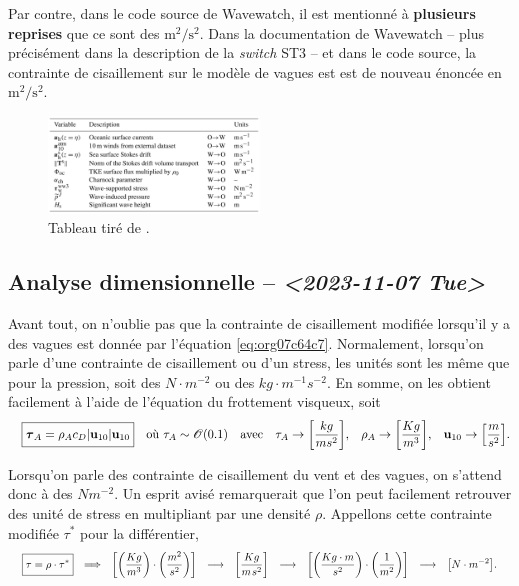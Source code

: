 \documentclass[10pt]{article}
\numberwithin{equation}{section}
\newcommand{\uu}{\vb{u}}
\newcommand{\tall}{\vphantom{pA^{x^x}_p}}
\newcommand{\pt}{\hspace{1pt}} %
\begin{document}
Par contre, dans le code source de Wavewatch, il est mentionné à \textbf{plusieurs reprises} que ce sont des \(\mathrm{m}^2/\mathrm{s}^2\).
Dans la documentation de Wavewatch -- plus précisément dans la description de la \emph{switch} ST3 -- et dans le code source, la contrainte de cisaillement sur le modèle de vagues est est de nouveau énoncée en \(\mathrm{m}^2/\mathrm{s}^2\).

\begin{figure}[ht]
\centering
\includegraphics[width=0.5\textwidth]{figures/articles/gmd-13-3067-2020-t01-web.png}
\caption{\label{fig:org12134f0}Tableau tiré de \textcite{couvelard2020development}.}
\end{figure}
\subsection{Analyse dimensionnelle -- \textit{<2023-11-07 Tue>}}
\label{sec:org3419b5b}
\label{org914db11}

Avant tout, on n'oublie pas que la contrainte de cisaillement modifiée lorsqu'il y a des vagues est donnée par l'équation \ref{eq:org07c64c7}. 
Normalement, lorsqu'on parle d'une contrainte de cisaillement ou d'un stress, les unités sont les même que pour la pression, soit des \(N\cdot m^{-2}\) ou des \(kg\cdot m^{-1}s^{-2}\).
En somme, on les obtient facilement à l'aide de l'équation du frottement visqueux, soit
\begin{align}
   && \boxed{\boldsymbol{\tau}_{A} = \rho_A c_D \abs{\uu_{10}} \uu_{10}\tall }
   && \text{où}\  \tau_A \sim \mathscr{O}\qty(0.1)
   && \text{avec}
   && \tau_A \rightarrow \qty[\frac{kg}{ms^2}],
   && \rho_A \rightarrow \qty[\frac{Kg}{m^3}],
   && \uu_{10} \rightarrow \qty[\frac{m}{s^2}].
\end{align}

Lorsqu'on parle des contrainte de cisaillement du vent et des vagues, on s'attend donc à des \(N m^{-2}\).
Un esprit avisé remarquerait que l'on peut facilement retrouver des unité de stress en multipliant par une densité \(\rho\).
Appellons cette contrainte modifiée \(\tau^*\) pour la différentier,
\begin{align}
   && \boxed{\tau = \rho \cdot \tau^*\tall}
   &&\Longrightarrow
   &&\qty[\qty(\frac{Kg}{m^3})\cdot \qty(\frac{m^2}{s^2})]
   &&\longrightarrow
   &&\qty[ \frac{Kg}{m\pt s^2} ]
   &&\longrightarrow
   &&\qty[\qty(\frac{Kg\cdot m}{s^2})\cdot \qty(\frac{1}{m^2})]
   &&\longrightarrow
   &&\qty[N \cdot m^{-2}]. &&
\end{align}
\end{document}
